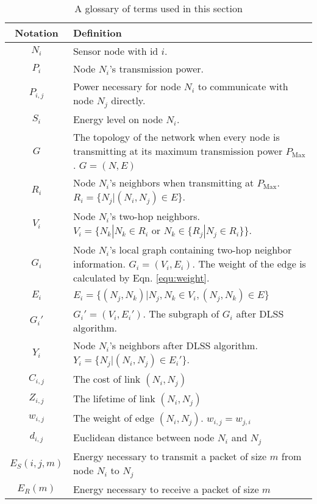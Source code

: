 \documentclass[journal,12pt,onecolumn]{IEEEtran}
\begin{document}
\begin{table}[!t]
\begin{center}
\begin{tabular}{cp{6cm}}
\hline
Notation & Definition \\
\hline
$N_i$    &Sensor node with id $i$.\\
\hline
$P_i$    &Node $N_i$'s transmission power.\\
\hline
$P_{i,j}$    &Power necessary for node $N_i$ to communicate with node $N_j$ directly.\\
\hline
$S_i$    &Energy level on node $N_i$.\\
\hline
$G$    &The topology of the network when every node is transmitting at its maximum transmission power $P_{\text{Max}}$. $G=(N,E)$\\
\hline
$R_i$    &Node $N_i$'s neighbors when transmitting at $P_{\text{Max}}$. $R_i=\{N_j|(N_i,N_j)\in E\}$.\\
\hline
$V_i$    &Node $N_i$'s two-hop neighbors. $V_i=\{N_k|N_k\in R_i \text{ or } N_k\in \{R_j|N_j\in R_i\}\}$.\\
\hline
$G_i$    & Node $N_i$'s local graph containing two-hop neighbor information. $G_i=(V_i,E_i)$. The weight of the edge is calculated by Eqn.\,\,\ref{equ:weight}.\\
\hline
$E_i$    &$E_i=\{(N_j,N_k)|N_j,N_k\in V_i,(N_j,N_k)\in E\}$\\
\hline
$G_i'$        & $G_i'=(V_i,E_i')$. The subgraph of $G_i$ after DLSS algorithm.\\
\hline
$Y_i$    &Node $N_i$'s neighbors after DLSS algorithm. $Y_i=\{N_j|(N_i,N_j)\in E_i'\}$.\\
\hline
$C_{i,j}$        &The cost of link $(N_i,N_j)$\\
\hline
$Z_{i,j}$        &The lifetime of link $(N_i,N_j)$\\
\hline
$w_{i,j}$        &The weight of edge $(N_i,N_j)$. $w_{i,j}=w_{j,i}$\\
\hline
$d_{i,j}$        &Euclidean distance between node $N_i$ and $N_j$\\
\hline
$E_S(i,j,m)$        &Energy necessary to transmit a packet of size $m$ from node $N_i$ to $N_j$\\
\hline
$E_R(m)$        &Energy necessary to receive a packet of size $m$\\
\hline
\end{tabular}
\vspace{8pt}
\caption{A glossary of terms used in this section} \label{table:term}
\vspace{-25pt}
\end{center}
\end{table}
 
\end{document}

